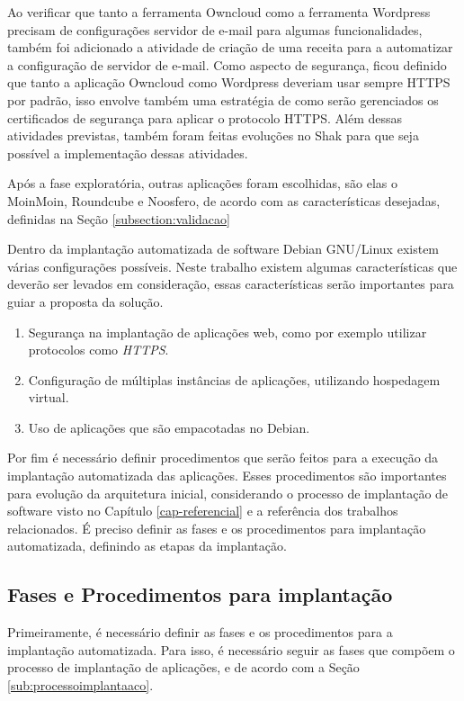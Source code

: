 Ao verificar que tanto a ferramenta Owncloud como a ferramenta Wordpress precisam
de configurações servidor de e-mail para algumas funcionalidades, também foi adicionado
a atividade de criação de uma receita para a automatizar a configuração de
servidor de e-mail. Como aspecto de segurança, ficou definido que tanto a aplicação
Owncloud como Wordpress deveriam usar sempre HTTPS por padrão, isso envolve também
uma estratégia de como serão gerenciados os certificados de segurança para aplicar
o protocolo HTTPS. Além dessas atividades previstas, também foram feitas evoluções
no Shak para que seja possível a implementação dessas atividades.

Após a fase exploratória, outras aplicações foram escolhidas, são elas o MoinMoin, 
Roundcube e Noosfero, de acordo com as características desejadas, 
definidas na Seção \ref{subsection:validacao}

Dentro da implantação automatizada de software Debian GNU/Linux existem várias
configurações possíveis. Neste trabalho existem algumas características que 
deverão ser levados em consideração, essas características serão importantes para 
guiar a proposta da solução.

\begin{enumerate}
  \item  Segurança na implantação de aplicações web,
   como por exemplo utilizar protocolos como \textit{HTTPS}.
  \item  Configuração de múltiplas instâncias de
   aplicações, utilizando hospedagem virtual.
  \item  Uso de aplicações que são empacotadas no Debian.
\end{enumerate}

Por fim é necessário definir procedimentos que serão
feitos para a execução da implantação automatizada das aplicações. Esses procedimentos são
importantes para evolução da arquitetura inicial, considerando
o processo de implantação de software visto no Capítulo \ref{cap-referencial}
e a referência dos trabalhos relacionados. É preciso definir as fases e os
procedimentos para implantação automatizada, definindo as etapas
da implantação.

\subsection{Fases e Procedimentos para implantação}
\label{sec:fases}

Primeiramente, é necessário definir as fases e os procedimentos para a implantação 
automatizada. Para isso, é necessário seguir as fases que compõem o processo de 
implantação de aplicações, e de acordo com a Seção \ref{sub:processoimplantaaco}. 

